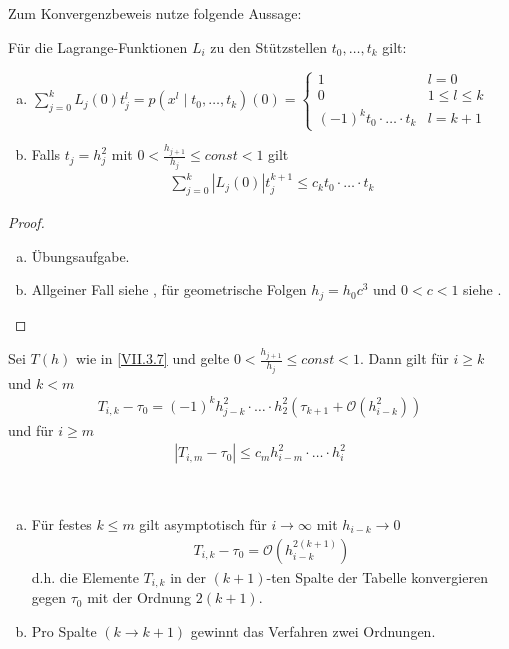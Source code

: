 \documentclass[ngerman,fontsize=11pt, paper=a4, parskip=half, titlepage=true, toc=bib]{scrbook}
\begin{document}
Zum Konvergenzbeweis nutze folgende Aussage:

\begin{Leme}\label{7.3.8}
  Für die Lagrange-Funktionen $L_i$ 
  zu den Stützstellen $t_0,\ldots, t_k$ gilt:
  \begin{enumerate}[a)]
  \item $\sum_{j=0}^kL_j(0)t_j^l=p(x^l\mid t_0,\ldots,t_k)(0)
    =\begin{cases}
      1 &l=0\\
      0&1\leq l\leq k\\
      (-1)^kt_0\cdot\ldots\cdot t_k & l=k+1
    \end{cases}$
  \item Falls $t_j=h_j^2$ mit $0<\frac{h_{j+1}}{h_j}\leq const<1$ gilt
    \begin{gather*}
      \sum_{j=0}^k\left|L_j(0)\right|t_j^{k+1}\leq
      c_kt_0\cdot\ldots\cdot t_k
    \end{gather*}
  \end{enumerate}
  \begin{proof}~
    \begin{enumerate}[a)]
    \item Übungsaufgabe.
    \item Allgeiner Fall siehe \cite{stoerbulirsch},
      für geometrische Folgen $h_j=h_0c^3$ und $0<c<1$ siehe
      \cite{stoer}. 
    \end{enumerate}
  \end{proof}
\end{Leme}

\begin{Satze}\label{7.3.9}
  Sei $T(h)$ wie in \eqref{VII.3.7}
  und gelte $0<\frac{h_{j+1}}{h_j}\leq const<1$.
  Dann gilt für $i\geq k$ und $k<m$
  \begin{gather}
    T_{i,k}-\tau_0=(-1)^kh_{j-k}^2\cdot\ldots
    \cdot h_2^2\left(\tau_{k+1}+\mathcal{O}(h_{i-k}^2)\right)
    \label{VII.3.11}
  \end{gather}
  und für $i\geq m$
  \begin{gather}
    \left| T_{i,m}-\tau_0 \right| \leq c_mh_{i-m}^2\cdot\ldots \cdot h_i^2
    \label{VII.3.12}
  \end{gather}
\end{Satze}

\begin{Kore}~
  \begin{enumerate}[a)]
  \item Für festes $k\leq m $ gilt asymptotisch 
    für $i\longrightarrow \infty$ mit $h_{i-k}\longrightarrow 0$
    \begin{gather}
      T_{i,k}-\tau_0 = \mathcal{O}\left(h_{i-k}^{2(k+1)}\right)
      \label{VII.3.13}
    \end{gather}
    d.h. die Elemente $T_{i,k}$ in der $(k+1)$-ten Spalte der Tabelle
    konvergieren gegen $\tau_0$ mit der Ordnung $2(k+1)$.
  \item Pro Spalte $(k \rightarrow k+1)$ 
    gewinnt das Verfahren zwei Ordnungen.
  \end{enumerate}

\end{Kore}
\end{document}
